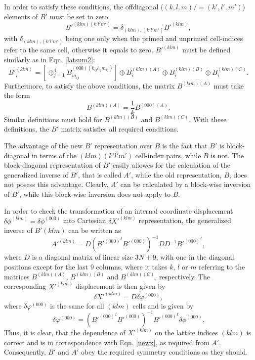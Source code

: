 \documentclass[prl,aps,preprint,superbib,12pt]{revtex4}
\begin{document}
In order to satisfy these conditions, the offdiagonal 
($(k,l,m)/=(k',l',m')$)
elements of $B'$ must be set to zero:
\begin{equation} \label{kronecker}
B'^{(klm)(k'l'm')} = \delta_{(klm),(k'l'm')} B'^{(klm)} ,
\end{equation}
with $\delta_{(klm),(k'l'm')}$ being one only when the primed
and unprimed cell-indices refer to the same cell, otherwise 
it equals to zero.
$B'^{(klm)}$ must be defined similarly as in Eqn. \ref{latsum2}:
\begin{equation} \label{latsum4}
B'^{(klm)}_{i} =
[\oplus_{j=1}^{4}
B^{(000)(k_{ij}l_{ij}m_{ij})}_{ia_{ij}}
] \oplus B^{(klm)(A)}_{i} \oplus B^{(klm)(B)}_{i} 
\oplus B^{(klm)(C)}_{i} .
\end{equation}
Furthermore, to satisfy the above conditions, 
the matrix $B^{(klm)(A)}$ must take the form
\begin{equation} 
B^{(klm)(A)} = \frac{1}{k} B^{(000)(A)} .
\end{equation}
Similar definitions must hold for $B^{(klm)(B)}$ and
$B^{(klm)(C)}$. 
With these definitions, the $B'$ matrix satisfies all
required conditions.

The advantage of the new $B'$ representation over $B$ is the fact
that $B'$ is block-diagonal in terms of the $(klm)(k'l'm')$
cell-index pairs, while $B$ is not. The block-diagonal representation
of $B'$ easily allowes for the calculation of the generalized
inverse of $B'$, that is called $A'$, while the old representation,
$B$, does not posess this advantage. Clearly, $A'$ can be calculated
by a block-wise inversion of $B'$, while this block-wise inversion
does not apply to $B$.

In order to check the transformation of an internal
coordinate displacement 
$\delta \phi^{(klm)}=\delta \phi^{(000)}$ into 
Cartesian $\delta X'^{(klm)}$
representation, the generalized inverse of $B'{(klm)}$ 
can be written as
\begin{equation}
A'^{(klm)} = D {\left({B'^{(000)}}^t B'^{(000)}\right)}^{-1} D D^{-1} {B'^{(000)}}^t ,
\end{equation}
where $D$ is a diagonal matrix of linear size $3N+9$, with one in the
diagonal positions except for the last $9$ columns, where it takes
$k$, $l$ or $m$ referring to the matrices $B^{(klm)(A)}$, 
$B^{(klm)(B)}$ and $B^{(klm)(C)}$, respectively.
The corresponding $X'^{(klm)}$ displacement is then given by
\begin{equation}
\delta X'^{(klm)} = D \delta \varphi^{(000)} ,
\end{equation}
where $\delta \varphi^{(000)}$ is the same for all $(klm)$ cells and
is given by
\begin{equation}
\delta \varphi^{(000)} = 
{\left({B'^{(000)}}^t B'^{(000)}\right)}^{-1} {B'^{(000)}}^t 
\delta \phi^{(000)}.
\end{equation}
Thus, it is clear, that the dependence of $X'^{(klm)}$ on the
lattice indices $(klm)$ is correct and is in correspondence with
Eqn. \ref{newx}, as required from $A'$. Consequently, $B'$ and $A'$
obey the required symmetry conditions as they should.
\end{document}

